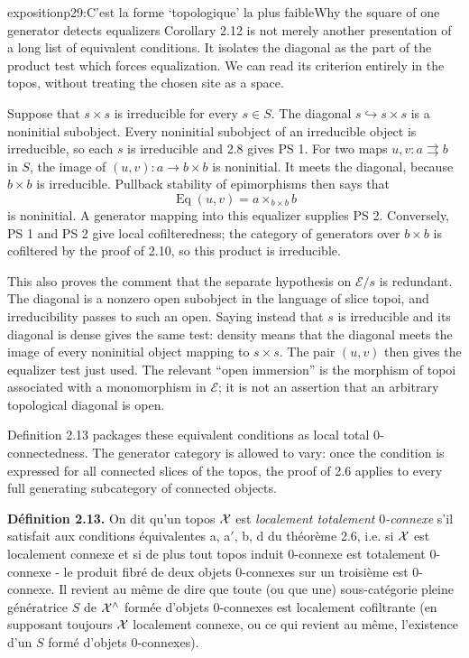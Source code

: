 \begin{dcomment}{exposition}{p29:C'est la forme `topologique' la plus faible}{Why the square of one generator detects equalizers}
Corollary 2.12 is not merely another presentation of a long list of equivalent conditions. It isolates the diagonal as the part of the product test which forces equalization. We can read its criterion entirely in the topos, without treating the chosen site as a space.

Suppose that $s\times s$ is irreducible for every $s\in S$. The diagonal $s\hookrightarrow s\times s$ is a noninitial subobject. Every noninitial subobject of an irreducible object is irreducible, so each $s$ is irreducible and 2.8 gives PS 1. For two maps $u,v:a\rightrightarrows b$ in $S$, the image of $(u,v):a\to b\times b$ is noninitial. It meets the diagonal, because $b\times b$ is irreducible. Pullback stability of epimorphisms then says that
\[
 \operatorname{Eq}(u,v)=a\times_{b\times b}b
\]
is noninitial. A generator mapping into this equalizer supplies PS 2. Conversely, PS 1 and PS 2 give local cofilteredness; the category of generators over $b\times b$ is cofiltered by the proof of 2.10, so this product is irreducible.

This also proves the comment that the separate hypothesis on $\mathcal E/s$ is redundant. The diagonal is a nonzero open subobject in the language of slice topoi, and irreducibility passes to such an open. Saying instead that $s$ is irreducible and its diagonal is dense gives the same test: density means that the diagonal meets the image of every noninitial object mapping to $s\times s$. The pair $(u,v)$ then gives the equalizer test just used. The relevant ``open immersion'' is the morphism of topoi associated with a monomorphism in $\mathcal E$; it is not an assertion that an arbitrary topological diagonal is open.

Definition 2.13 packages these equivalent conditions as local total $0$-connectedness. The generator category is allowed to vary: once the condition is expressed for all connected slices of the topos, the proof of 2.6 applies to every full generating subcategory of connected objects.
\end{dcomment}


\textbf{Définition 2.13.} On dit qu'un topos $\mathcal{X}$ est \textit{localement totalement} $0$\textit{-connexe} s'il satisfait aux conditions équivalentes a, a$'$, b, d du théorème 2.6, i.e. si $\mathcal{X}$ est localement connexe et si de plus tout topos induit 0-connexe est totalement 0-connexe - le produit fibré de deux objets 0-connexes sur un troisième est 0-connexe. Il revient au même de dire que toute (ou que une) sous-catégorie pleine génératrice $S$ de $\mathcal{X}^\wedge$ formée d'objets 0-connexes est localement cofiltrante (en supposant toujours $\mathcal{X}$ localement connexe, ou ce qui revient au même, l'existence d'un $S$ formé d'objets 0-connexes).

